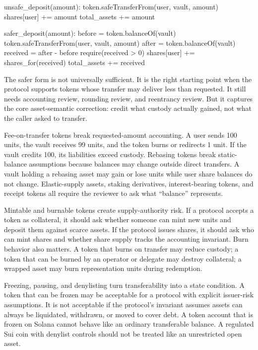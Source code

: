 \begin{codeblock}
unsafe_deposit(amount):
    token.safeTransferFrom(user, vault, amount)
    shares[user] += amount
    total_assets += amount

safer_deposit(amount):
    before = token.balanceOf(vault)
    token.safeTransferFrom(user, vault, amount)
    after = token.balanceOf(vault)
    received = after - before
    require(received > 0)
    shares[user] += shares_for(received)
    total_assets += received
\end{codeblock}

The safer form is not universally sufficient. It is the right starting point when the protocol supports tokens whose transfer may deliver less than requested. It still needs accounting review, rounding review, and reentrancy review. But it captures the core asset-semantic correction: credit what custody actually gained, not what the caller asked to transfer.

Fee-on-transfer tokens break requested-amount accounting. A user sends 100 units, the vault receives 99 units, and the token burns or redirects 1 unit. If the vault credits 100, its liabilities exceed custody. Rebasing tokens break static-balance assumptions because balances may change outside direct transfers. A vault holding a rebasing asset may gain or lose units while user share balances do not change. Elastic-supply assets, staking derivatives, interest-bearing tokens, and receipt tokens all require the reviewer to ask what ``balance'' represents.

Mintable and burnable tokens create supply-authority risk. If a protocol accepts a token as collateral, it should ask whether someone can mint new units and deposit them against scarce assets. If the protocol issues shares, it should ask who can mint shares and whether share supply tracks the accounting invariant. Burn behavior also matters. A token that burns on transfer may reduce custody; a token that can be burned by an operator or delegate may destroy collateral; a wrapped asset may burn representation units during redemption.

Freezing, pausing, and denylisting turn transferability into a state condition. A token that can be frozen may be acceptable for a protocol with explicit issuer-risk assumptions. It is not acceptable if the protocol's invariant assumes assets can always be liquidated, withdrawn, or moved to cover debt. A token account that is frozen on Solana cannot behave like an ordinary transferable balance. A regulated Sui coin with denylist controls should not be treated like an unrestricted open asset.

